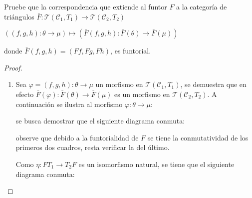 \documentclass{article}
\newcommand{\cc}{\mathscr{C}}
\begin{document}
\begin{enumerate}
\bigskip

Pruebe que la correspondencia que extiende al funtor $F$ a la categor\'ia de tri\'angulos $\bar{F} :\mathcal{T}(\mathscr{C}_{1},T_{1})\to \mathcal{T}(\mathscr{C}_{2},T_{2})$
\begin{center}
$((f,g,h):\theta \to \mu)\longmapsto (\bar{F}(f,g,h):\bar{F}(\theta)\to \bar{F}(\mu))$ 
\end{center} 
donde $\bar{F}(f,g,h)=(Ff,Fg,Fh)$, es funtorial.


\begin{proof}
\begin{enumerate}
\item Sea $\varphi=(f,g,h):\theta \to \mu$ un morfismo en $\mathcal{T}(\cc_{1},T_{1})$, se demuestra que en efecto $\bar{F}(\varphi):\bar{F}(\theta) \to \bar{F}(\mu)$ es un morfismo en $\mathcal{T}(\cc_{2},T_{2})$. A continuación se ilustra al morfismo $\varphi:\theta \to \mu$:

\begin{center}
\end{center}

se busca demostrar que el siguiente diagrama conmuta:

\begin{center}
\end{center}

observe que debido a la funtorialidad de $F$ se tiene la conmutatividad de los primeros dos cuadros, resta verificar la del \'ultimo.

\bigskip

Como $\eta:FT_{1}\to T_{2}F$ es un isomorfismo natural, se tiene que el siguiente diagrama conmuta:

\begin{center}
\end{center}


\end{enumerate}
\end{proof}
\end{enumerate}
\end{document}
